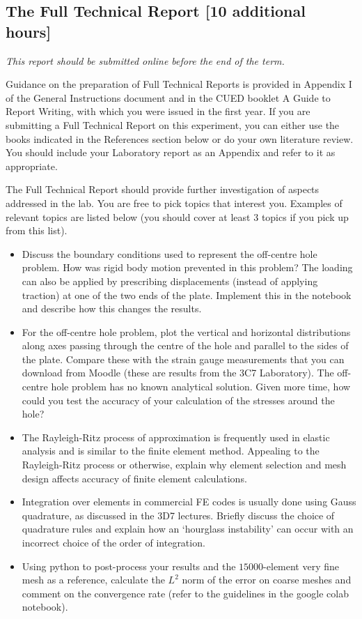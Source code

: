 \documentclass[11pt,a4paper]{article}
\newcommand{\com}[1]{\textcolor{red}{[#1]}}
\begin{document}
%
\subsection{The Full Technical Report [10 additional hours]}
%
\textit{This report should be submitted online before the end of the term.}

Guidance on the preparation of Full Technical Reports is provided in Appendix I of the
General Instructions document and in the CUED booklet A Guide to Report Writing,
with which you were issued in the first year. If you are submitting a Full Technical Report
on this experiment, you can either use the books indicated in the References section
below or do your own literature review. You should include your Laboratory report as an Appendix and refer to it as
appropriate.


The Full Technical Report should provide further investigation of aspects addressed in the lab.
You are free to pick topics that interest you. Examples of relevant topics are listed below (you should cover at least 3 topics if you pick up from this list).
%
\begin{itemize}
\item Discuss the boundary conditions used to represent the off-centre hole problem.
How was rigid body motion prevented in this problem? The loading can also be applied by prescribing displacements (instead of applying traction) at one of the two ends of the plate. Implement this in the notebook and describe how this changes the results.
\item For the off-centre hole problem, plot the vertical and horizontal distributions along axes passing through the centre of the hole and parallel to the sides of the plate. Compare
these with the strain gauge measurements that you can download from Moodle (these are results
from the 3C7 Laboratory). The off-centre hole problem has no known analytical solution. Given more time,
how could you test the accuracy of your calculation of the stresses around the hole?
\item The Rayleigh-Ritz process of approximation is frequently used in elastic analysis
and is similar to the finite element method. Appealing to the Rayleigh-Ritz process
or otherwise, explain why element selection and mesh design affects accuracy of
finite element calculations.%
\item Integration over elements in commercial FE codes is usually done using Gauss
quadrature, as discussed in the 3D7 lectures. Briefly discuss the choice of quadrature rules and explain how an ‘hourglass instability’ can occur with an incorrect
choice of the order of integration.
\item Using python to post-process your results and the $15000$-element very fine mesh as a reference, calculate the $L^2$ norm of the error on coarse meshes and comment on the convergence rate (refer to the guidelines in the google colab notebook).
\end{itemize}
\end{document}
